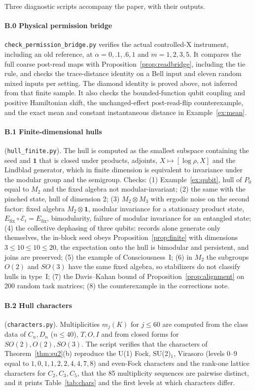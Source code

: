 Three diagnostic scripts accompany the paper, with their outputs.

\paragraph{B.0 Physical permission bridge}
\texttt{check\_permission\_bridge.py} verifies the actual controlled-X
instrument, including an old reference, at \(\alpha=0,.1,.6,1\) and
\(m=1,2,3,5\). It compares the full coarse post-read maps with
Proposition~\ref{prop:readbridge}, including the tie rule, and checks
the trace-distance identity on a Bell input and eleven random mixed
inputs per setting. The diamond identity is proved above, not inferred
from that finite sample. It also checks the bounded-function qubit
coupling and positive Hamiltonian shift, the unchanged-effect
post-read-flip counterexample, and the exact mean and constant
instantaneous distance in Example~\ref{ex:mean}.

\paragraph{B.1 Finite-dimensional hulls} (\texttt{hull\_finite.py}). The hull is
computed as the smallest subspace containing the seed and \(\mathbf 1\) that is closed
under products, adjoints, \(X\mapsto[\log\rho,X]\) and the Lindblad generator, which in
finite dimension is equivalent to invariance under the modular group and the
semigroup. Checks: (1) Example~\ref{ex:qubit}, hull of \(P_0\) equal to \(M_2\) and the
fixed algebra not modular-invariant; (2) the same with the pinched state, hull of
dimension 2; (3) \(M_2\otimes M_3\) with ergodic noise on the second factor:
fixed algebra \(M_2\otimes\mathbf 1\), modular invariance for a stationary product state,
\(E_{\mathrm{fix}}\circ\mathcal E_t=E_{\mathrm{fix}}\), bimodularity, failure of modular
invariance for an entangled state; (4) the collective dephasing of three qubits: records
alone generate only themselves, the in-block seed obeys
Proposition~\ref{prop:finite} with dimensions \(3\le10\le10\le20\), the expectation onto
the hull is bimodular and persistent, and joins are preserved; (5) the example of
Consciousness~I; (6) in \(M_2\) the subgroups \(O(2)\) and \(SO(3)\) have the same fixed
algebra, so stabilizers do not classify hulls in type~I; (7) the Davis--Kahan bound of
Proposition~\ref{prop:alignment} on 200 random task matrices; (8) the counterexample in
the corrections note.

\paragraph{B.2 Hull characters} (\texttt{characters.py}). Multiplicities \(m_j(K)\) for
\(j\le60\) are computed from the class data of \(C_n,D_n\) (\(n\le40\)), \(T,O,I\) and from
closed forms for \(SO(2),O(2),SO(3)\). The script verifies that the characters of
Theorem~\ref{thm:su2}(b) reproduce the U(1) Fock, SU(2)\(_1\), Virasoro (levels 0--9
equal to \(1,0,1,1,2,2,4,4,7,8\)) and even-Fock characters and the rank-one lattice
characters for \(C_2,C_3,C_5\), that the 85 multiplicity sequences are pairwise distinct,
and it prints Table~\ref{tab:chars} and the first levels at which characters differ.

